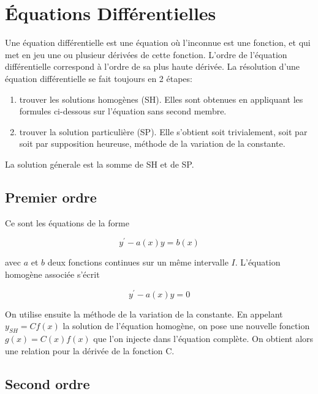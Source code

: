 \chapter{Équations Différentielles}
Une équation différentielle est une équation où l'inconnue est une fonction, et qui met en jeu une ou plusieur dérivées de cette fonction. L'ordre de l'équation différentielle correspond à l'ordre de sa plus haute dérivée. La résolution d'une équation différentielle se fait toujours en 2 étapes:
\begin{enumerate}
    \item trouver les solutions homogènes (SH). Elles sont obtenues en appliquant les formules ci-dessous sur l'équation sans second membre.
    \item trouver la solution particulière (SP). Elle s'obtient soit trivialement, soit par soit par supposition heureuse, méthode de la variation de la constante.
\end{enumerate}

La solution génerale est la somme de SH et de SP.

\section{Premier ordre}

Ce sont les équations de la forme

$$
y^{\prime}-a(x) y=b(x)
$$

avec $a$ et $b$ deux fonctions continues sur un même intervalle $I$.
L'équation homogène associée s'écrit

$$
y^{\prime}-a(x) y=0
$$


On utilise ensuite la méthode de la variation de la constante. En appelant $y_{S H}=C f(x)$ la solution de l'équation homogène, on pose une nouvelle fonction $g(x)=C(x) f(x)$ que l'on injecte dans l'équation complète. On obtient alors une relation pour la dérivée de la fonction C.

\section{Second ordre}

